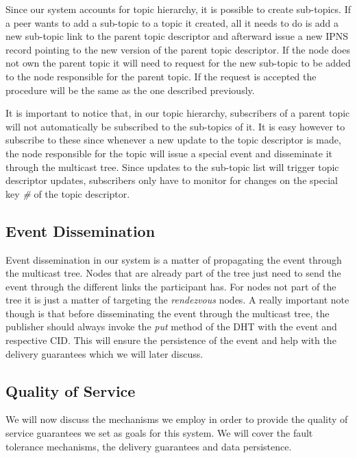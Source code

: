 Since our system accounts for topic hierarchy, it is possible to create
sub-topics. If a peer wants to add a sub-topic to a topic it created,
all it needs to do is add a new sub-topic link to the parent topic
descriptor and afterward issue a new IPNS record pointing to the new
version of the parent topic descriptor. If the node does not own the
parent topic it will need to request for the new sub-topic to be added
to the node responsible for the parent topic. If the request is accepted
the procedure will be the same as the one described previously.

It is important to notice that, in our topic hierarchy, subscribers of a
parent topic will not automatically be subscribed to the sub-topics of
it. It is easy however to subscribe to these since whenever a new
update to the topic descriptor is made, the node responsible for the
topic will issue a special event and disseminate it through the
multicast tree. Since updates to the sub-topic list will trigger topic
descriptor updates, subscribers only have to monitor for changes on the
special key \emph{\#} of the topic descriptor.

\subsection{Event Dissemination}\label{event-dissemination}

Event dissemination in our system is a matter of propagating the event
through the multicast tree. Nodes that are already part of the tree just
need to send the event through the different links the participant has.
For nodes not part of the tree it is just a matter of targeting the
\emph{rendezvous} nodes. A really important note though is that before
disseminating the event through the multicast tree, the publisher should
always invoke the \emph{put} method of the DHT with the event and
respective CID. This will ensure the persistence of the event and help
with the delivery guarantees which we will later discuss.

\subsection{Quality of Service}\label{quality-of-service}

We will now discuss the mechanisms we employ in order to provide the
quality of service guarantees we set as goals for this system. We will
cover the fault tolerance mechanisms, the delivery guarantees and data
persistence.

